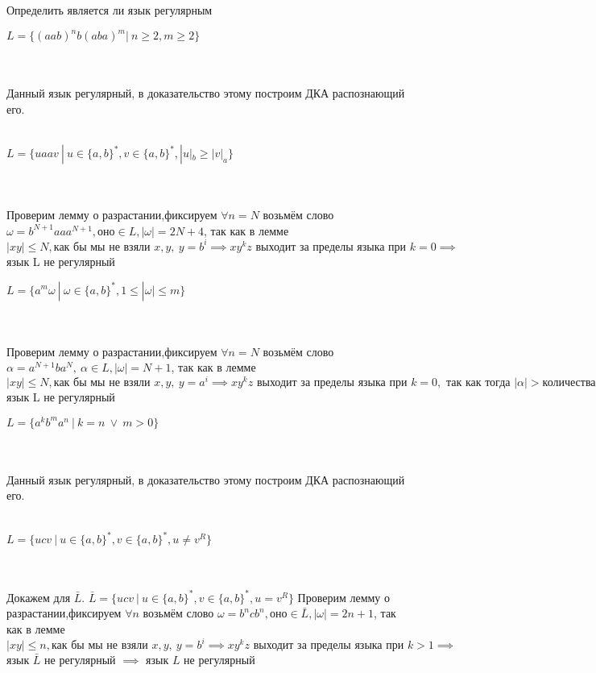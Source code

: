 \documentclass[10pt]{article}
\begin{document}
\begin{enumerate}
\begin{enumerate}[label*=\arabic*.]
	\end{enumerate}
	{\Large\item Определить является ли язык регулярным}
	\begin{enumerate}[label*=\arabic*.]
	{\large\item $L=\{(aab)^nb(aba)^m |\  n\geq 2 , m\geq 2\}$} \\
	\\
		Данный язык регулярный, в доказательство этому построим ДКА распознающий его.\\
		\\
	{\large\item $L=\{uaav\ |\ u\in\{a,b\}^*,v\in\{a,b\}^*, |u|_b\geq |v|_a \}$} \\
	\\
	Проверим лемму о разрастании,фиксируем $\forall n=N$ возьмём слово $\omega=b^{N+1}aaa^{N+1}, оно \in L, |\omega|=2N+4 $, так как в лемме $|xy|\leq N, \text{как бы мы не взяли } x , y,\ y=b^i \implies xy^kz \text{ выходит за пределы языка при } k=0 \implies$ язык L не регулярный\\
	{\large\item $L=\{a^m\omega\ |\ \omega\in\{a,b\}^*, 1\leq |\omega| \leq m \}$} \\
	\\
	Проверим лемму о разрастании,фиксируем $\forall n=N$ возьмём слово $\alpha=a^{N+1}ba^{N},\ \alpha \in L, |\omega|=N+1 $, так как в лемме $|xy|\leq N, \text{как бы мы не взяли } x , y,\ y=a^i \implies xy^kz \text{ выходит за пределы языка при } k=0,\text{ так как тогда } |\alpha|>\text{количества букв а слева } \implies$ язык L не регулярный\\
	{\large\item $L=\{a^kb^ma^n\ |\ k=n\ \lor \ m>0 \}$} \\
	\\
		Данный язык регулярный, в доказательство этому построим ДКА распознающий его.\\
		\\
	{\large\item $L=\{ucv\ |\ u\in\{a,b\}^*, v\in\{a,b\}^*, u\neq v^R \}$} \\
	\\
	Докажем для $\bar{L}$. $\bar{L}=\{ucv\ |\ u\in\{a,b\}^*, v\in\{a,b\}^*, u=v^R \}$ Проверим лемму о разрастании,фиксируем $\forall n$ возьмём слово $\omega=b^ncb^n, оно \in \bar{L}, |\omega|=2n+1 $, так как в лемме $|xy|\leq n, \text{как бы мы не взяли } x , y,\ y=b^i \implies xy^kz \text{ выходит за пределы языка при } k>1 \implies$ язык $\bar{L}$ не регулярный $\implies$ язык $L$ не регулярный\\
	\end{enumerate}
\end{enumerate}
\end{document}
